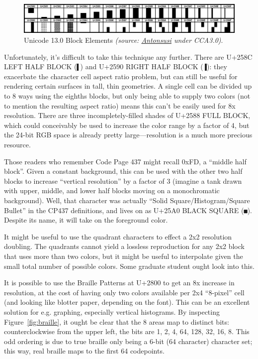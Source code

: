 \begin{figure}[!htb]
    \centering
    \includegraphics[width=.75\linewidth]{media/blockelements.png}
    \caption{Unicode 13.0 Block Elements \textit{(source: \href{https://commons.wikimedia.org/wiki/File:UCB_Block_Elements.png}{Antonsusi} under CCA3.0)}.}
    \label{fig:blockelements}
\end{figure}

Unfortunately, it's difficult to take this technique any further. There are
U+258C LEFT HALF BLOCK (\texttt{▌}) and U+2590 RIGHT HALF BLOCK (\texttt{▐}):
they exacerbate the character cell aspect ratio problem, but can still be
useful for rendering certain surfaces in tall, thin geometries. A single cell
can be divided up to 8 ways using the eighths blocks, but only being able to
supply two colors (not to mention the resulting aspect ratio) means this can't
be easily used for 8x resolution. There are three incompletely-filled shades of
U+2588 FULL BLOCK, which could conceivably be used to increase the color range
by a factor of 4, but the 24-bit RGB space is already pretty large---resolution
is a much more precious resource.

Those readers who remember Code Page 437 might recall 0xFD, a ``middle half
block''. Given a constant background, this can be used with the other two
half blocks to increase ``vertical resolution'' by a factor of 3 (imagine a
tank drawn with upper, middle, and lower half blocks moving on a monochromatic
background). Well, that character was actually ``Solid Square/Histogram/Square Bullet''
in the CP437 definitions\cite{cp437}, and lives on as U+25A0 BLACK SQUARE (\texttt{■}).
Despite its name, it will take on the foreground color.

It might be useful to use the quadrant characters to effect a 2x2 resolution
doubling. The quadrants cannot yield a lossless reproduction for any 2x2 block
that uses more than two colors, but it might be useful to interpolate given the
small total number of possible colors. Some graduate student ought look
into this.

It is possible to use the Braille Patterns at U+2800 to get an 8x increase in
resolution, at the cost of having only two colors available per 2x4 ``8-pixel''
cell (and looking like blotter paper, depending on the font). This can be an
excellent solution for e.g. graphing, especially vertical histograms. By
inspecting Figure~\ref{fig:braille}, it ought be clear that the 8 areas
map to distinct bits: counterclockwise from the upper left, the bits are 1, 2,
4, 64, 128, 32, 16, 8. This odd ordering is due to true braille only being a
6-bit (64 character) character set; this way, real braille maps to the first
64 codepoints.

